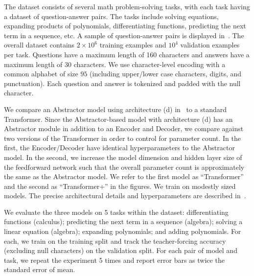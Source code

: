The dataset consists of several math problem-solving tasks, with each task having a dataset of question-answer pairs. The tasks include solving equations, expanding products of polynomials, differentiating functions, predicting the next term in a sequence, etc. A sample of question-answer pairs is displayed in~. The overall dataset contains $2 \times 10^6$ training examples and $10^4$ validation examples per task. Questions have a maximum length of 160 characters and answers have a maximum length of 30 characters. We use character-level encoding with a common alphabet of size $95$ (including upper/lower case characters, digits, and punctuation). Each question and answer is tokenized and padded with the null character.

We compare an Abstractor model using architecture (d) in~ to a standard Transformer. Since the Abstractor-based model with architecture (d) has an Abstractor module in addition to an Encoder and Decoder, we compare against two versions of the Transformer in order to control for parameter count. In the first, the Encoder/Decoder have identical hyperparameters to the Abstractor model. In the second, we increase the model dimension and hidden layer size of the feedforward network such that the overall parameter count is approximately the same as the Abstractor model. We refer to the first model as ``Transformer'' and the second as ``Transformer+'' in the figures. We train on modestly sized models. The precise architectural details and hyperparameters are described in~.


We evaluate the three models on 5 tasks within the dataset: differentiating functions (calculus); predicting the next term in a sequence (algebra); solving a linear equation (algebra); expanding polynomials; and adding polynomials. For each, we train on the training split and track the teacher-forcing accuracy (excluding null characters) on the validation split. For each pair of model and task, we repeat the experiment 5 times and report error bars as twice the standard error of mean.

